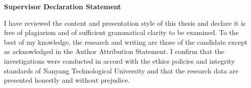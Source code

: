 \begin{titlepage}

\begin{center}
\Large{\bf{Supervisor Declaration Statement}}
\end{center}

\vspace{0.2in}

\begin{spacing}{2}
I have reviewed the content and presentation style of this thesis and declare it is free of plagiarism and of sufficient grammatical clarity to be examined.  To the best of my knowledge, the research and writing are those of the candidate except as acknowledged in the Author Attribution Statement. I confirm that the investigations were conducted in accord with the ethics policies and integrity standards of Nanyang Technological University and that the research data are presented honestly and without prejudice.
\end{spacing}

\vspace{6cm}

\begin{center}
	\makebox[4cm]{\dotfill}  \hfill \makebox[4cm]{\dotfill}\\
	      \hfill {}
\end{center}
\end{titlepage}
\newpage